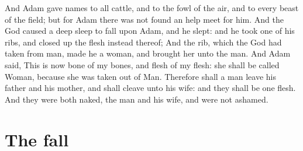 \begin{biblechapter}
\verse And Adam gave names to all cattle, and to the fowl of the air, and to every beast of the field; but for Adam there was not found an help meet for him.
\verse And the \LORD God caused a deep sleep to fall upon Adam, and he slept: and he took one of his ribs, and closed up the flesh instead thereof;
\verse And the rib, which the \LORD God had taken from man, made he a woman, and brought her unto the man.
\verse And Adam said, This is now bone of my bones, and flesh of my flesh: she shall be called Woman, because she was taken out of Man.
\verse Therefore shall a man leave his father and his mother, and shall cleave unto his wife: and they shall be one flesh.
\verse And they were both naked, the man and his wife, and were not ashamed.
\end{biblechapter}

\section*{The fall}
